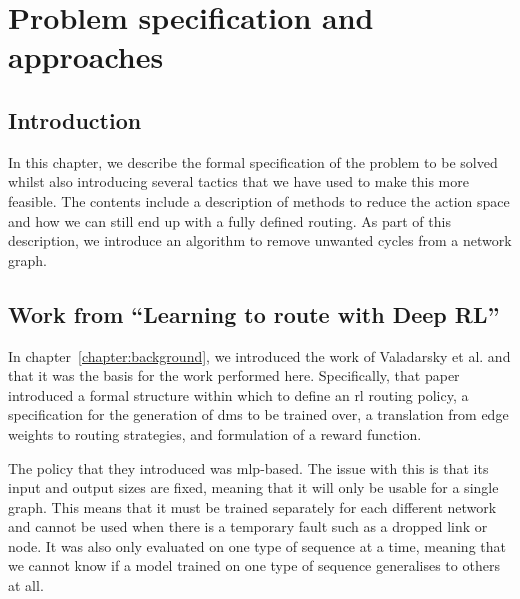 \chapter{Problem specification and approaches}
\label{chapter:problem}

\section{Introduction}
In this chapter, we describe the formal specification of the problem to be solved whilst also introducing several tactics that we have used to make this more feasible. The contents include a description of methods to reduce the action space and how we can still end up with a fully defined routing. As part of this description, we introduce an algorithm to remove unwanted cycles from a network graph.

\section{Work from ``Learning to route with Deep RL''}
In chapter~\ref{chapter:background}, we introduced the work of Valadarsky et al.\cite{valadarsky2017learning} and that it was the basis for the work performed here. Specifically, that paper introduced a formal structure within which to define an \ac{rl} routing policy, a specification for the generation of \acp{dm} to be trained over, a translation from edge weights to routing strategies, and formulation of a reward function.

The policy that they introduced was \ac{mlp}-based. The issue with this is that its input and output sizes are fixed, meaning that it will only be usable for a single graph. This means that it must be trained separately for each different network and cannot be used when there is a temporary fault such as a dropped link or node. It was also only evaluated on one type of sequence at a time, meaning that we cannot know if a model trained on one type of sequence generalises to others at all.


